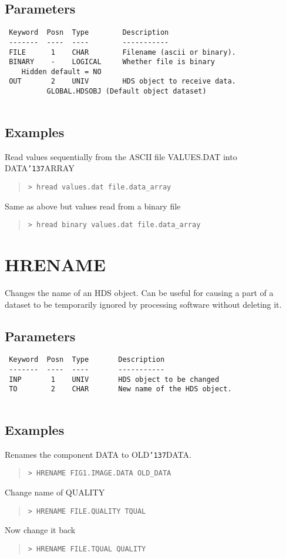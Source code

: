 \documentclass{book}
\renewcommand{\_}{{\tt\char'137}}     %
\begin{document}
\subsection{Parameters}
\begin{verbatim}
 Keyword  Posn  Type        Description
 -------  ----  ----        -----------
 FILE      1    CHAR        Filename (ascii or binary).
 BINARY    -    LOGICAL     Whether file is binary
    Hidden default = NO
 OUT       2    UNIV        HDS object to receive data.
          GLOBAL.HDSOBJ (Default object dataset)
 
\end{verbatim}\subsection{Examples}
Read values sequentially from the ASCII file VALUES.DAT into DATA\_ARRAY
\begin{quote}\begin{verbatim}
> hread values.dat file.data_array
\end{verbatim}\end{quote}
Same as above but values read from a binary file
\begin{quote}\begin{verbatim}
> hread binary values.dat file.data_array
\end{verbatim}\end{quote}
\section{HRENAME}
Changes the name of an HDS object. Can be useful for causing a
part of a dataset to be temporarily ignored by processing
software without deleting it.
 
\subsection{Parameters}
\begin{verbatim}
 Keyword  Posn  Type       Description
 -------  ----  ----       -----------
 INP       1    UNIV       HDS object to be changed
 TO        2    CHAR       New name of the HDS object.
 
\end{verbatim}\subsection{Examples}
Renames the component DATA to OLD\_DATA.
\begin{quote}\begin{verbatim}
> HRENAME FIG1.IMAGE.DATA OLD_DATA
\end{verbatim}\end{quote}
Change name of QUALITY
\begin{quote}\begin{verbatim}
> HRENAME FILE.QUALITY TQUAL
\end{verbatim}\end{quote}
Now change it back
\begin{quote}\begin{verbatim}
> HRENAME FILE.TQUAL QUALITY
\end{verbatim}\end{quote}
\end{document}
